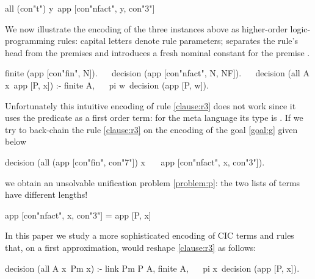 \documentclass[sigconf,natbib=false,review]{acmart}
\begin{document}
\begin{elpicode}
all (con"t") y\ app [con"nfact", y, con"3"]
\end{elpicode}

\noindent
We now illustrate the encoding of the three instances above as higher-order
logic-programming rules: capital letters denote rule
parameters; \elpiIn{:-} separates the rule's head from the premises and
 introduces a fresh nominal constant 
for the premise .

\begin{elpicode}
finite   (app [con"fin", N]).                         ~~
decision (app [con"nfact", N, NF]).                   ~~
decision (all A x\ app [P, x]) :- finite A,           ~~
  pi w\ decision (app [P, w]).
\end{elpicode}

\noindent
Unfortunately this intuitive encoding of rule \ref{clause:r3} does not work
since it uses the predicate  as a first order term: for the meta
language its type is . If we try to back-chain the rule
\ref{clause:r3} on the encoding of the goal \ref{goal:g} given below

\begin{elpicode}
decision (all (app [con"fin", con"7"]) x\              ~~
  app [con"nfact", x, con"3"]).
\end{elpicode}

\noindent
we obtain an unsolvable unification problem \ref{problem:p}:
the two lists of terms have different lengths!

\begin{elpicode}
app [con"nfact", x, con"3"] = app [P, x]               ~~
\end{elpicode}

\noindent
In this paper we study a more sophisticated encoding of CIC terms and rules
that, on a first approximation, would reshape \ref{clause:r3} as follows:

\begin{elpicode}
decision (all A x\ Pm x) :- link Pm P A, finite A,    ~~
  pi x\ decision (app [P, x]).
\end{elpicode}
\end{document}
